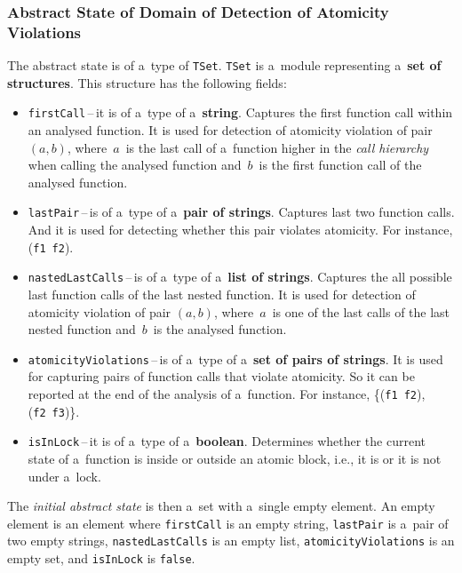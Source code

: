 \subsubsection{Abstract State of Domain of Detection of Atomicity Violations}

The abstract state is of a~type of \texttt{TSet}. \texttt{TSet} is a~module
representing a~\textbf{set of structures}. This structure has the following
fields:
\begin{itemize}
    \item
        \texttt{firstCall}\,--\,it is of a~type of a~\textbf{string}. Captures
        the first function call within an analysed function. It is used
        for detection of atomicity violation of pair $ (a, b) $,
        where~$ a $~is the last call of a~function higher in the \emph{call
        hierarchy} when calling the analysed function and~$ b $~is the first
        function call of the analysed function.

    \item
        \texttt{lastPair}\,--\,is of a~type of a~\textbf{pair of strings}.
        Captures last two function calls. And it is used for detecting
        whether this pair violates atomicity. For instance,
        (\texttt{f1}~\texttt{f2}).

    \item
        \texttt{nastedLastCalls}\,--\,is of a~type of a~\textbf{list of
        strings}. Captures the all possible last function calls of the
        last nested function. It is used for detection of atomicity violation
        of pair $ (a, b) $, where~$ a $~is one of the last calls of the
        last nested function and~$ b $~is the analysed function.

    \item
        \texttt{atomicityViolations}\,--\,is of a~type of a~\textbf{set
        of pairs of strings}. It is used for capturing pairs of function calls
        that violate atomicity. So it can be reported at the end of the
        analysis of a~function. For instance, \{(\texttt{f1}~\texttt{f2}),
        (\texttt{f2}~\texttt{f3})\}.

    \item
        \texttt{isInLock}\,--\,it is of a~type of a~\textbf{boolean}. Determines
        whether the current state of a~function is inside or outside an
        atomic block, i.e., it is or it is not under a~lock.
\end{itemize}
The \emph{initial abstract state} is then a~set with a~single empty element.
An empty element is an element where \texttt{firstCall} is an empty
string, \texttt{lastPair} is a~pair of two empty strings,
\texttt{nastedLastCalls} is an empty list, \texttt{atomicityViolations} is
an empty set, and \texttt{isInLock} is \texttt{false}.

